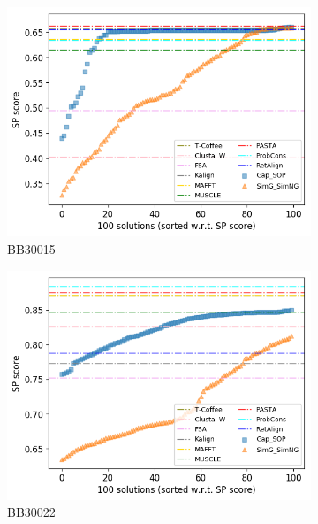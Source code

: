 \begin{figure}[!htbp]
\begin{adjustwidth}{-1cm}{-1cm}
\begin{subfigure}{0.22\textwidth}
		\end{subfigure}
		\begin{subfigure}{0.22\textwidth}
			\includegraphics[width=\columnwidth]{Figure/summary/precomputedInit/Balibase/BB30015_pairs_density_single_run_2}
			\caption{BB30015}
		\end{subfigure}
		\begin{subfigure}{0.22\textwidth}
			\includegraphics[width=\columnwidth]{Figure/summary/precomputedInit/Balibase/BB30022_pairs_density_single_run_2}
			\caption{BB30022}
		\end{subfigure}
		\begin{subfigure}{0.22\textwidth}

\end{subfigure}
\end{adjustwidth}
\end{figure}
